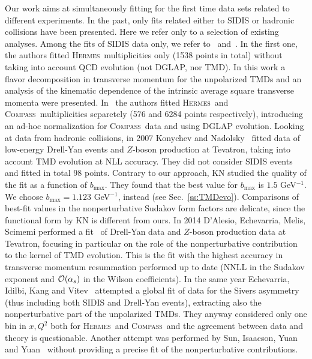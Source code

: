 \documentclass[aps,preprintnumbers,showpacs,nofootinbib,superscriptaddress,floatfix]{revtex4}
\newcommand{\hermes}{\textsc{Hermes}}
\newcommand{\compass}{\textsc{Compass}}
\begin{document}
Our work aims at simultaneously fitting for the first time data sets related to different experiments. 
In the past, only fits related either to SIDIS or hadronic collisions have been presented. Here we refer only to a selection of existing analyses. 
Among the fits of SIDIS data only, we refer to~\cite{Signori:2013mda} and~\cite{Anselmino:2013lza}. In the first one, the authors fitted \hermes\ multiplicities only (1538 points in total) without taking into account QCD evolution (not DGLAP, nor TMD). In this work a flavor decomposition in transverse momentum for the unpolarized TMDs and an analysis of the kinematic dependence of the intrinsic average square transverse momenta were presented. 
In~\cite{Anselmino:2013lza} the authors fitted \hermes\ and \compass\ multiplicities separetely (576 and 6284 points respectively), introducing an ad-hoc normalization for \compass\ data and using DGLAP evolution. 
Looking at data from hadronic collisions, in 2007 Konychev and Nadolsky~\cite{Konychev:2005iy} fitted data of low-energy Drell-Yan events and $Z$-boson production at Tevatron, taking into account TMD evolution at NLL accuracy. They did not consider SIDIS events and fitted in total 98 points. Contrary to our approach, KN studied the quality of the fit as a function of $b_{\text{max}}$. They found that the best value for $b_{\text{max}}$ is $1.5$ GeV$^{-1}$. We choose $b_{\text{max}}=1.123$ GeV$^{-1}$, instead (see Sec.~\ref{ss:TMDevo}). Comparisons of best-fit values in the nonperturbative Sudakov form factors are delicate, since the functional form by KN is different from ours.
In 2014 D'Alesio, Echevarria, Melis, Scimemi performed a fit~\cite{DAlesio:2014mrz} of Drell-Yan data and $Z$-boson production data at Tevatron, focusing in particular on the role of the nonperturbative contribution to the kernel of TMD evolution. This is the fit with the highest accuracy in transverse momentum resummation performed up to date (NNLL in the Sudakov exponent and ${\cal O}(\alpha_s)$ in the Wilson coefficients). 
In the same year Echevarria, Idilbi, Kang and Vitev~\cite{Echevarria:2014xaa} attempted a global fit of data for the Sivers asymmetry (thus including both SIDIS and Drell-Yan events), extracting also the nonperturbative part of the unpolarized TMDs. They anyway considered only one bin in $x, Q^2$ both for \hermes\ and \compass\ and the agreement between data and theory is questionable. 
Another attempt was performed by Sun, Isaacson, Yuan and Yuan~\cite{Su:2014wpa} without providing a precise fit of the nonperturbative contributions.
\end{document}
